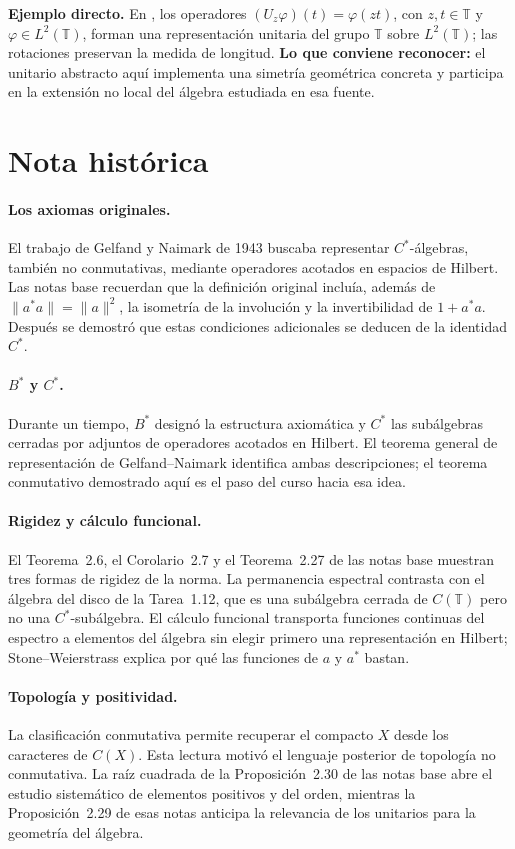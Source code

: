 \begin{investigacion}
\textbf{Ejemplo directo.} En \cite[Sec.~1, p.~20]{BFK2006}, los operadores
$(U_z\varphi)(t)=\varphi(zt)$, con $z,t\in\mathbb T$ y
$\varphi\in L^2(\mathbb T)$, forman una representación unitaria del grupo
$\mathbb T$ sobre $L^2(\mathbb T)$; las rotaciones preservan la medida de longitud.
\textbf{Lo que conviene reconocer:} el unitario abstracto aquí implementa una
simetría geométrica concreta y participa en la extensión no local del álgebra
estudiada en esa fuente.
\end{investigacion}

\section*{Nota histórica}

\paragraph{Los axiomas originales.}
El trabajo de Gelfand y Naimark de 1943 buscaba representar $C^*$-álgebras,
también no conmutativas, mediante operadores acotados en espacios de Hilbert.
Las notas base recuerdan que la definición original incluía, además de
$\|a^*a\|=\|a\|^2$, la isometría de la involución y la invertibilidad de
$1+a^*a$. Después se demostró que estas condiciones adicionales se deducen de
la identidad $C^*$.

\paragraph{$B^*$ y $C^*$.}
Durante un tiempo, $B^*$ designó la estructura axiomática y $C^*$ las
subálgebras cerradas por adjuntos de operadores acotados en Hilbert. El teorema
general de representación de Gelfand--Naimark identifica ambas descripciones;
el teorema conmutativo demostrado aquí es el paso del curso hacia esa idea.

\paragraph{Rigidez y cálculo funcional.}
El Teorema~2.6, el Corolario~2.7 y el Teorema~2.27 de las notas base muestran tres formas de
rigidez de la norma. La permanencia espectral contrasta con el álgebra del disco
de la Tarea~1.12, que es una subálgebra cerrada de $C(\mathbb T)$ pero no una
$C^*$-subálgebra. El cálculo funcional transporta funciones continuas del
espectro a elementos del álgebra sin elegir primero una representación en
Hilbert; Stone--Weierstrass explica por qué las funciones de $a$ y $a^*$ bastan.

\paragraph{Topología y positividad.}
La clasificación conmutativa permite recuperar el compacto $X$ desde los
caracteres de $C(X)$. Esta lectura motivó el lenguaje posterior de topología no
conmutativa. La raíz cuadrada de la Proposición~2.30 de las notas base abre el estudio sistemático
de elementos positivos y del orden, mientras la Proposición~2.29 de esas notas anticipa la
relevancia de los unitarios para la geometría del álgebra.
